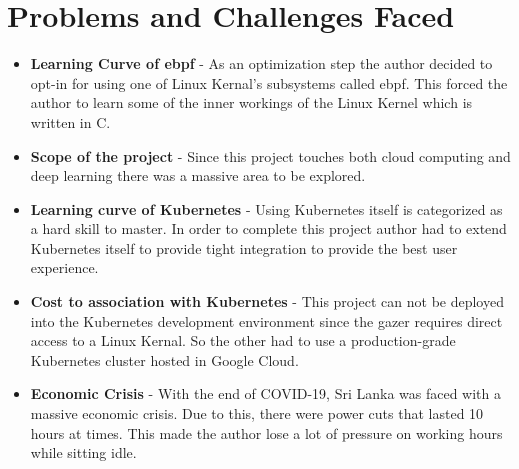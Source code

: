 \section{Problems and Challenges Faced}

\begin{itemize}[noitemsep,nolistsep]
    \item \textbf{Learning Curve of \ac{ebpf}} - As an optimization step the author decided to opt-in for using one of Linux Kernal's subsystems called \ac{ebpf}. This forced the author to learn some of the inner workings of the Linux Kernel which is written in C.
    \item \textbf{Scope of the project} - Since this project touches both cloud computing and deep learning there was a massive area to be explored.
    \item \textbf{Learning curve of Kubernetes} - Using Kubernetes itself is categorized as a hard skill to master. In order to complete this project author had to extend Kubernetes itself to provide tight integration to provide the best user experience.
    \item \textbf{Cost to association with Kubernetes} - This project can not be deployed into the Kubernetes development environment since the \ac{gazer} requires direct access to a Linux Kernal. So the other had to use a production-grade Kubernetes cluster hosted in Google Cloud.
    \item \textbf{Economic Crisis} - With the end of COVID-19, Sri Lanka was faced with a massive economic crisis. Due to this, there were power cuts that lasted 10 hours at times. This made the author lose a lot of pressure on working hours while sitting idle.
\end{itemize}